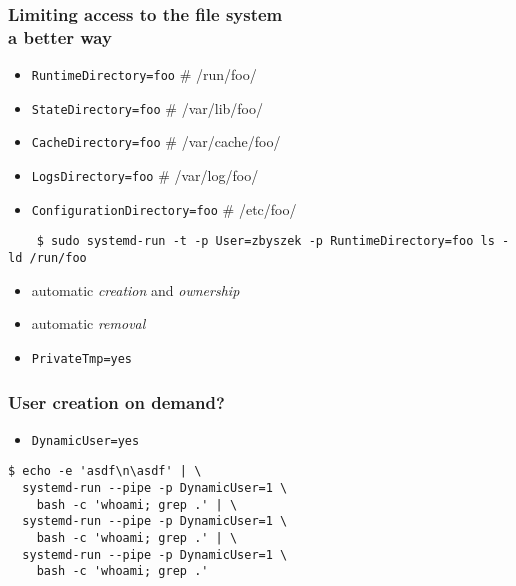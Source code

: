 \documentclass[serif]{beamer}
\begin{document}
\begin{frame}
  \frametitle{Limiting access to the file system\\a better way}
  \begin{itemize}
  \item \texttt{RuntimeDirectory=foo}            \# /run/foo/
  \item \texttt{StateDirectory=foo}              \# /var/lib/foo/
  \item \texttt{CacheDirectory=foo}              \# /var/cache/foo/
  \item \texttt{LogsDirectory=foo}               \# /var/log/foo/
  \item \texttt{ConfigurationDirectory=foo}      \# /etc/foo/
  \end{itemize}
\end{frame}

\begin{frame}[fragile]
  \begin{verbatim}
    $ sudo systemd-run -t -p User=zbyszek -p RuntimeDirectory=foo ls -ld /run/foo
  \end{verbatim}

  \begin{itemize}
  \item automatic \textit{creation} and \textit{ownership}
  \item automatic \textit{removal}
  \end{itemize}
\end{frame}

\begin{frame}
  \begin{itemize}
  \item \texttt{PrivateTmp=yes}
  \end{itemize}
\end{frame}

\begin{frame}[fragile]
  \frametitle{User creation on demand?}
  \begin{itemize}
  \item \texttt{DynamicUser=yes}
  \end{itemize}

  \begin{verbatim}
$ echo -e 'asdf\n\asdf' | \
  systemd-run --pipe -p DynamicUser=1 \
    bash -c 'whoami; grep .' | \
  systemd-run --pipe -p DynamicUser=1 \
    bash -c 'whoami; grep .' | \
  systemd-run --pipe -p DynamicUser=1 \
    bash -c 'whoami; grep .'
  \end{verbatim}
\end{frame}
\end{document}
